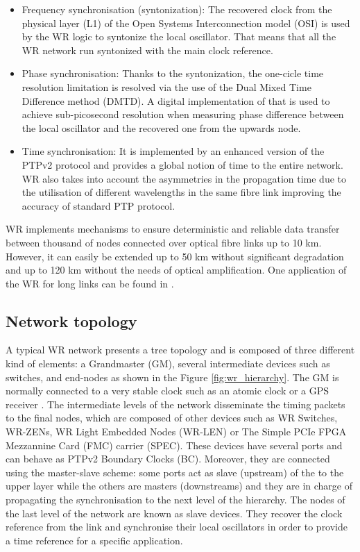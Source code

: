 \begin{itemize}
	
	\item Frequency synchronisation (syntonization): The recovered clock from the physical layer (L1) of the Open Systems Interconnection model (OSI) is used by 
	the WR logic to syntonize the local oscillator. That means that all the WR network run syntonized with the main clock reference.
	
	\item Phase synchronisation: Thanks to the syntonization, the one-cicle time resolution limitation is resolved via the use of the Dual Mixed Time Difference method (DMTD). A digital implementation of that \cite{Moreira2011} is used to achieve sub-picosecond resolution when measuring phase difference between the local oscillator and the recovered one from the upwards node.
	
	\item Time synchronisation: It is implemented by an enhanced version of the PTPv2 protocol and provides a global notion of time to the entire network. WR 
	also takes into account the asymmetries in the propagation time due to the utilisation of different wavelengths in the same fibre link improving the 
	accuracy of standard PTP protocol. 
\end{itemize}

WR implements mechanisms to ensure deterministic and reliable data transfer between thousand of nodes connected over optical fibre links up to 10 km.
However, it can easily be extended up to 50 km without significant degradation and up to 120 km without the needs of optical amplification. One application of the WR for long links can be found in \cite{Kaur2017}.

\subsection{Network topology} \label{subsec:wr-net}

A typical WR network presents a tree topology and is composed of three different
kind of elements: a Grandmaster (GM), several intermediate devices such as
switches, and end-nodes as shown in the Figure \ref{fig:wr_hierarchy}. The GM
is normally connected to a very stable clock such as an atomic clock or a GPS
receiver \cite{Daniluk2012}. The intermediate levels of the network disseminate
the timing packets to the final nodes, which are composed of other devices such
as WR Switches, WR-ZENs, WR Light Embedded Nodes (WR-LEN) or The Simple PCIe FPGA Mezzannine Card (FMC) carrier (SPEC). These devices have several ports and can behave as PTPv2 Boundary Clocks (BC). Moreover, they are connected using the master-slave scheme: some ports act as slave (upstream) of the to the upper layer while the others are masters (downstreams) and they are in charge of propagating the synchronisation to the next level of the hierarchy. The nodes of the last level of the network are known as slave devices. They recover the clock reference from the link and synchronise their local oscillators in order to provide a time reference for a specific application.

